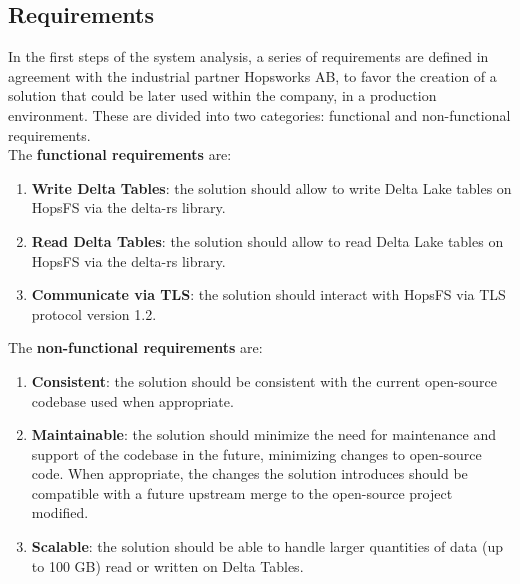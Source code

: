 \subsection{Requirements}
\label{subsec:requirements}
In the first steps of the system analysis, a series of requirements are defined in agreement with the industrial partner Hopsworks \gls{AB}, to favor the creation of a solution that could be later used within the company, in a production environment. These are divided into two categories: functional and non-functional requirements. \\ The \textbf{functional requirements} are:
\begin{enumerate}
    \item \textbf{Write Delta Tables}: the solution should allow to write Delta Lake tables on \gls{HopsFS} via the delta-rs library.
    \item \textbf{Read Delta Tables}: the solution should allow to read Delta Lake tables on \gls{HopsFS} via the delta-rs library.
    \item \textbf{Communicate via TLS}: the solution should interact with \gls{HopsFS} via \gls{TLS} protocol version 1.2.
\end{enumerate}
The \textbf{non-functional requirements} are:
\begin{enumerate}
    \item \textbf{Consistent}: the solution should be consistent with the current open-source codebase used when appropriate.
    \item \textbf{Maintainable}: the solution should minimize the need for maintenance and support of the codebase in the future, minimizing changes to open-source code. When appropriate, the changes the solution introduces should be compatible with a future upstream merge to the open-source project modified.
    \item \textbf{Scalable}: the solution should be able to handle larger quantities of data (up to 100 GB) read or written on Delta Tables.
\end{enumerate}

